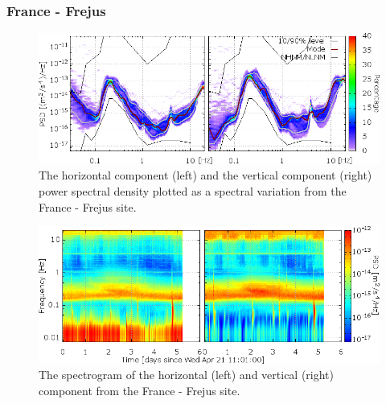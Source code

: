 \subsubsection*{France - Frejus}
\begin{figure}[h]
\centering
\includegraphics[width=\textwidth]{./Sec_SiteInfra/Figures/results/Frejus-A_multiplot1}
\caption{The horizontal component (left) and the vertical component (right) power spectral density plotted as a spectral variation from the France - Frejus site.}
\label{fig:Frejus-A_multiplot1}
\end{figure}\begin{figure}[h]
\centering
\includegraphics[width=\textwidth]{./Sec_SiteInfra/Figures/results/Frejus-A_multiplot2}
\caption{The spectrogram of the horizontal (left) and vertical (right) component from the France - Frejus site.}
\label{fig:Frejus-A_multiplot2}
\end{figure}

\pagebreak
\FloatBarrier
